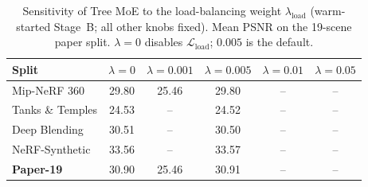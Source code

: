 \begin{table}[t]
\centering
\caption{Sensitivity of Tree MoE to the load-balancing weight $\lambda_{\mathrm{load}}$ (warm-started Stage~B; all other knobs fixed). Mean PSNR on the 19-scene paper split. $\lambda{=}0$ disables $\mathcal{L}_{\mathrm{load}}$; $0.005$ is the default.}
\label{tab:lambda-load}
\setlength{\tabcolsep}{4pt}
\small
\begin{tabular}{lccccc}
\toprule
Split & $\lambda=0$ & $\lambda=0.001$ & $\lambda=0.005$ & $\lambda=0.01$ & $\lambda=0.05$ \\
\midrule
Mip-NeRF 360 & 29.80 & 25.46 & 29.80 & -- & -- \\
Tanks \& Temples & 24.53 & -- & 24.52 & -- & -- \\
Deep Blending & 30.51 & -- & 30.50 & -- & -- \\
NeRF-Synthetic & 33.56 & -- & 33.57 & -- & -- \\
\textbf{Paper-19} & 30.90 & 25.46 & 30.91 & -- & -- \\
\bottomrule
\end{tabular}
\end{table}
